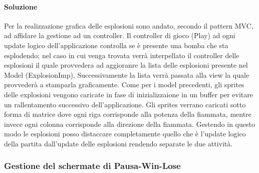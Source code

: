 \documentclass[a4paper,12pt]{report}
\begin{document}
\paragraph{Soluzione} Per la realizzazione grafica delle esplosioni sono andato, secondo il pattern MVC, ad affidare la gestione ad un controller. Il controller di gioco (Play) ad ogni update logico dell'applicazione controlla se è presente una bomba che sta esplodendo; nel caso in cui venga trovata verrà interpellato il controller delle esplosioni il quale provvedera ad aggioranre la lista delle esplosioni presente nel Model (ExplosionImp). Successivamente la lista verrà passata alla view la quale provvederà a stamparla graficamente. Come per i model precedenti, gli sprites delle explosioni vengono caricate in fase di inizializzaione in un buffer per evitare un rallentamento successivo dell'applicazione. Gli sprites verrano caricati sotto forma di matrice dove ogni riga corrisponde alla potenza della fiammata, mentre invece ogni colonna corrisponde alla direzione della fiammata. Gestendo in questo modo le esplosioni posso distaccare completamente quello che è l'update logico della partita dall'update delle esplosioni rendendo separate le due attività. 
\subsubsection{Gestione del schermate di Pausa-Win-Lose}
\end{document}
